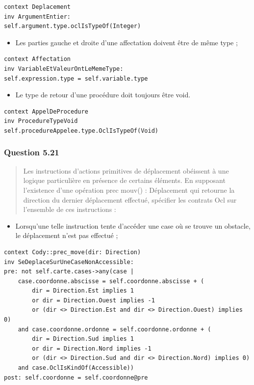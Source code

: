 \documentclass[]{article}
\providecommand{\tightlist}{%
  \setlength{\itemsep}{0pt}\setlength{\parskip}{0pt}}
\begin{document}
\begin{verbatim}
context Deplacement
inv ArgumentEntier:
self.argument.type.oclIsTypeOf(Integer)
\end{verbatim}

\begin{itemize}
\tightlist
\item
  Les parties gauche et droite d'une affectation doivent être de même
  type ;
\end{itemize}

\begin{verbatim}
context Affectation
inv VariableEtValeurOntLeMemeType:
self.expression.type = self.variable.type
\end{verbatim}

\begin{itemize}
\tightlist
\item
  Le type de retour d'une procédure doit toujours être void.
\end{itemize}

\begin{verbatim}
context AppelDeProcedure
inv ProcedureTypeVoid
self.procedureAppelee.type.OclIsTypeOf(Void)
\end{verbatim}

\hypertarget{question-5.21}{%
\subsubsection{Question 5.21}\label{question-5.21}}

\begin{quote}
Les instructions d'actions primitives de déplacement obéissent à une
logique particulière en présence de certains éléments. En supposant
l'existence d'une opération prec mouv() : Déplacement qui retourne la
direction du dernier déplacement effectué, spécifier les contrats Ocl
sur l'ensemble de ces instructions :
\end{quote}

\begin{itemize}
\tightlist
\item
  Lorsqu'une telle instruction tente d'accéder une case où se trouve un
  obstacle, le déplacement n'est pas effectué ;
\end{itemize}

\begin{verbatim}
context Cody::prec_move(dir: Direction)
inv SeDeplaceSurUneCaseNonAccessible:
pre: not self.carte.cases->any(case |
    case.coordonne.abscisse = self.coordonne.abscisse + (
        dir = Direction.Est implies 1
        or dir = Direction.Ouest implies -1
        or (dir <> Direction.Est and dir <> Direction.Ouest) implies 0)
    and case.coordonne.ordonne = self.coordonne.ordonne + (
        dir = Direction.Sud implies 1
        or dir = Direction.Nord implies -1
        or (dir <> Direction.Sud and dir <> Direction.Nord) implies 0)
    and case.OclIsKindOf(Accessible))
post: self.coordonne = self.coordonne@pre
\end{verbatim}
\end{document}
